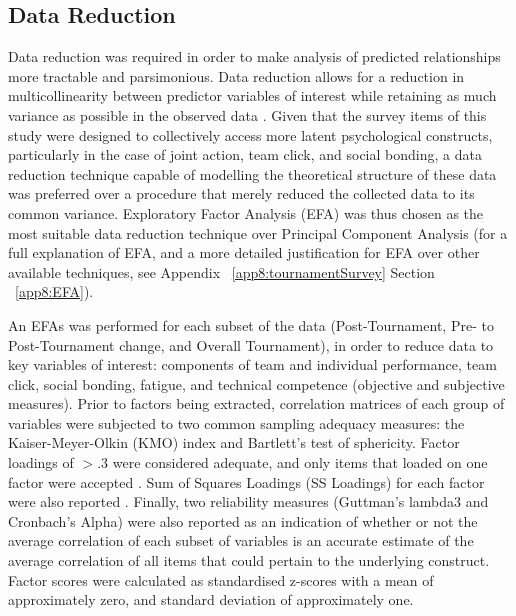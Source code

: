 \begin{CJK}{UTF8}{gbsn}
\subsection{Data Reduction\label{Ch5:dataReduction}}
Data reduction was required in order to make analysis of predicted relationships more tractable and parsimonious.  Data reduction allows for a reduction in multicollinearity between predictor variables of interest while retaining as much variance as possible in the observed data \citep{Yong2013}.  Given that the survey items of this study were designed to collectively access more latent psychological constructs, particularly in the case of joint action, team click, and social bonding, a data reduction technique capable of modelling the theoretical structure of these data was preferred over a procedure that merely reduced the collected data to its common variance. Exploratory Factor Analysis (EFA) was thus chosen as the most suitable data reduction technique over Principal Component Analysis (for a full explanation of EFA, and a more detailed justification for EFA over other available techniques, see Appendix ~\ref{app8:tournamentSurvey} Section ~\ref{app8:EFA}).

An EFAs was performed for each subset of the data (Post-Tournament, Pre- to Post-Tournament change, and Overall Tournament), in order to reduce data to key variables of interest: components of team and individual performance, team click, social bonding, fatigue, and technical competence (objective and subjective measures).  Prior to factors being extracted, correlation matrices of each group of variables were subjected to two common sampling adequacy measures: the Kaiser-Meyer-Olkin (KMO) index and Bartlett’s test of sphericity.  Factor loadings of $> .3$ were considered adequate, and only items that loaded on one factor were accepted \citep{Field2012}. Sum of Squares Loadings (SS Loadings) for each factor were also reported \citep{Dziuban1974}.  Finally, two reliability measures (Guttman's lambda3 and Cronbach's Alpha) were also reported as an indication of whether or not the average correlation of each subset of variables is an accurate estimate of the average correlation of all items that could pertain to the underlying construct.  Factor scores were calculated as standardised z-scores with a mean of approximately zero, and standard deviation of approximately one.


\end{CJK}
